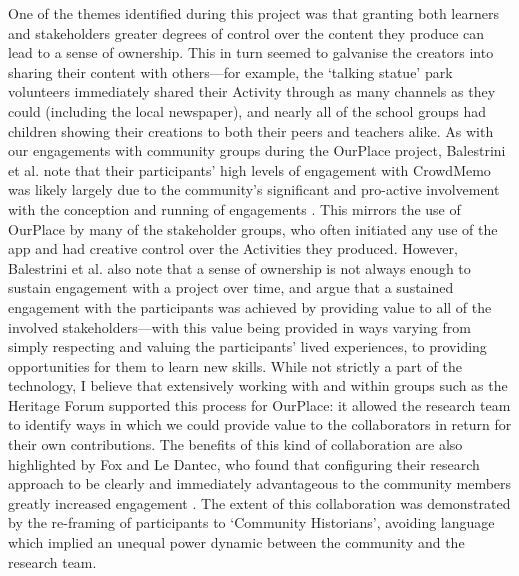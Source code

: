 One of the themes identified during this project was that granting both learners and stakeholders greater degrees of control over the content they produce can lead to a sense of ownership. This in turn seemed to galvanise the creators into sharing their content with others---for example, the `talking statue' park volunteers immediately shared their Activity through as many channels as they could (including the local newspaper), and nearly all of the school groups had children showing their creations to both their peers and teachers alike. As with our engagements with community groups during the OurPlace project, Balestrini et al. note that their participants' high levels of engagement with CrowdMemo was likely largely due to the community's significant and pro-active involvement with the conception and running of engagements \citep{Balestrini2014}. This mirrors the use of OurPlace by many of the stakeholder groups, who often initiated any use of the app and had creative control over the Activities they produced. However, Balestrini et al. also note that a sense of ownership is not always enough to sustain engagement with a project over time, and argue that a sustained engagement with the participants was achieved by providing value to all of the involved stakeholders---with this value being provided in ways varying from simply respecting and valuing the participants' lived experiences, to providing opportunities for them to learn new skills. While not strictly a part of the technology, I believe that extensively working with and within groups such as the Heritage Forum supported this process for OurPlace: it allowed the research team to identify ways in which we could provide value to the collaborators in return for their own contributions. The benefits of this kind of collaboration are also highlighted by Fox and Le Dantec, who found that configuring their research approach to be clearly and immediately advantageous to the community members greatly increased engagement \citep{Fox2014}. The extent of this collaboration was demonstrated by the re-framing of participants to `Community Historians', avoiding language which implied an unequal power dynamic between the community and the research team.

